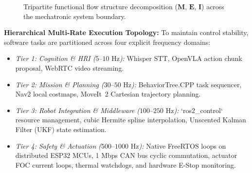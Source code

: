 \documentclass[10pt,a4paper]{article}
\begin{document}
\begin{figure}[ht]
{%
}
\vspace{-0.6em}
\caption{Tripartite functional flow structure decomposition ($\mathbf{M}$, $\mathbf{E}$, $\mathbf{I}$) across the mechatronic system boundary.}
\label{fig:functional_structure}
\vspace{-0.4em}
\end{figure}

\textbf{Hierarchical Multi-Rate Execution Topology:} To maintain control stability, software tasks are partitioned across four explicit frequency domains:
\begin{itemize}[leftmargin=1.2em,noitemsep,topsep=1pt]
  \item \emph{Tier 1: Cognition \& HRI ($5\text{--}10\text{ Hz}$):} Whisper STT, OpenVLA action chunk proposal, WebRTC video streaming.
  \item \emph{Tier 2: Mission \& Planning ($30\text{--}50\text{ Hz}$):} BehaviorTree.CPP task sequencer, Nav2 local costmaps, MoveIt~2 Cartesian trajectory planning.
  \item \emph{Tier 3: Robot Integration \& Middleware ($100\text{--}250\text{ Hz}$):} `ros2\_control` resource management, cubic Hermite spline interpolation, Unscented Kalman Filter (UKF) state estimation.
  \item \emph{Tier 4: Safety \& Actuation ($500\text{--}1000\text{ Hz}$):} Native FreeRTOS loops on distributed ESP32 MCUs, 1 Mbps CAN bus cyclic commutation, actuator FOC current loops, thermal watchdogs, and hardware E-Stop monitoring.
\end{itemize}
\end{document}
